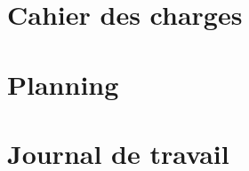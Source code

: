 \begin{appendix}
	\chapter{Cahier des charges}
	\label{Annexe_CDC}
	
	
	\chapter{Planning}
	\label{Planning}
	
	
	\chapter{Journal de travail}
	\label{Journal de travail}
	
	
\end{appendix}
